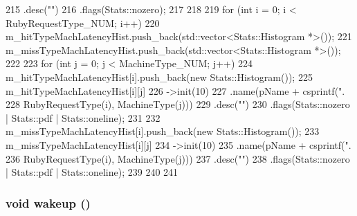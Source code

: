 \begin{DoxyCode}
{{215             .desc("")
216             .flags(Stats::nozero);
217     }
218 
219     for (int i = 0; i < RubyRequestType_NUM; i++) {
220         m_hitTypeMachLatencyHist.push_back(std::vector<Stats::Histogram *>());
221         m_missTypeMachLatencyHist.push_back(std::vector<Stats::Histogram *>());
222 
223         for (int j = 0; j < MachineType_NUM; j++) {
224             m_hitTypeMachLatencyHist[i].push_back(new Stats::Histogram());
225             m_hitTypeMachLatencyHist[i][j]
226                 ->init(10)
227                 .name(pName + csprintf(".%
228                                        RubyRequestType(i), MachineType(j)))
229                 .desc("")
230                 .flags(Stats::nozero | Stats::pdf | Stats::oneline);
231 
232             m_missTypeMachLatencyHist[i].push_back(new Stats::Histogram());
233             m_missTypeMachLatencyHist[i][j]
234                 ->init(10)
235                 .name(pName + csprintf(".%
236                                        RubyRequestType(i), MachineType(j)))
237                 .desc("")
238                 .flags(Stats::nozero | Stats::pdf | Stats::oneline);
239         }
240     }
241 }
\end{DoxyCode}
\hypertarget{classProfiler_ae674290a26ecbd622c5160e38e8a4fe9}{
\subsubsection[{wakeup}]{\setlength{\rightskip}{0pt plus 5cm}void wakeup ()}}
\label{classProfiler_ae674290a26ecbd622c5160e38e8a4fe9}


